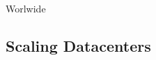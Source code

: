 \documentclass[aspectratio=169]{beamer}
\begin{document}
{
\begin{frame}{Worlwide}
\end{frame}
}

\subsection{Scaling Datacenters}
\end{document}
